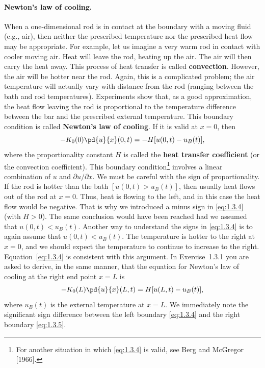 \paragraph{Newton's law of cooling.}
When a one-dimensional rod is in contact at the boundary with a moving fluid (e.g., air), then neither the prescribed temperature nor the prescribed heat flow may be appropriate. For example, let us imagine a very warm rod in contact with cooler moving air. Heat will leave the rod, heating up the air. The air will then carry the heat away. This process of heat transfer is called \textbf{convection}. However, the air will be hotter near the rod. Again, this is a complicated problem; the air temperature will actually vary with distance from the rod (ranging between the bath and rod temperatures). Experiments show that, as a good approximation, the heat flow leaving the rod is proportional to the temperature difference between the bar and the prescribed external temperature. This boundary condition is called \textbf{Newton's law of cooling}. If it is valid at $x = 0$, then
\begin{equation}
-K_0(0)\pd{u}{x}(0,t) = -H[u(0,t) - u_B(t)],
\label{eq:1.3.4}
\end{equation}
where the proportionality constant $H$ is called the \textbf{heat transfer coefficient} (or the convection coefficient). This boundary condition\footnote{For another situation in which \eqref{eq:1.3.4} is valid, see Berg and McGregor [1966].} involves a linear combination of $u$ and $\partial u/\partial x$. We must be careful with the sign of proportionality. If the rod is hotter than the bath $[u(0,t) > u_B(t)]$, then usually heat flows out of the rod at $x = 0$. Thus, heat is flowing to the left, and in this case the heat flow would be negative. That is why we introduced a minus sign in \eqref{eq:1.3.4} (with $H > 0$). The same conclusion would have been reached had we assumed that $u(0,t) < u_B(t)$. Another way to understand the signs in \eqref{eq:1.3.4} is to again assume that $u(0,t) < u_B(t)$. The temperature is hotter to the right at $x = 0$, and we should expect the temperature to continue to increase to the right. Equation~\eqref{eq:1.3.4} is consistent with this argument. In Exercise~1.3.1 you are asked to derive, in the same manner, that the equation for Newton's law of cooling at the right end point $x = L$ is
\begin{equation}
-K_0(L)\pd{u}{x}(L,t) = H[u(L,t) - u_B(t)],
\label{eq:1.3.5}
\end{equation}
where $u_B(t)$ is the external temperature at $x = L$. We immediately note the significant sign difference between the left boundary \eqref{eq:1.3.4} and the right boundary \eqref{eq:1.3.5}.

